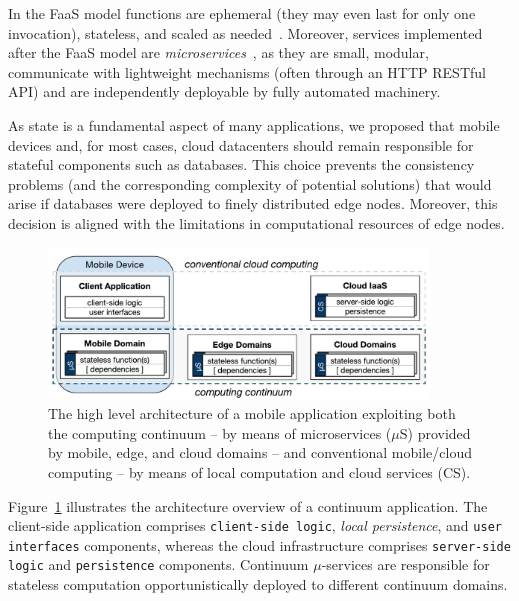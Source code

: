 In the FaaS model functions are ephemeral (they may even last for only one invocation), stateless, and scaled as needed~\cite{Roberts:2016}. Moreover, services implemented after the FaaS model are \textit{microservices}~\cite{lewis2014microservices}, as they are small, modular, communicate with lightweight mechanisms (often through an HTTP RESTful API) and are independently deployable by fully automated machinery. %

As state is a fundamental aspect of many applications, we proposed that mobile devices and, for most cases, cloud datacenters should remain responsible for stateful components such as databases. This choice prevents the consistency problems (and the corresponding complexity of potential solutions) that would arise if databases were deployed to finely distributed edge nodes. Moreover, this decision is aligned with the limitations in computational resources of edge nodes. %

\begin{figure}[tbp]
	\includegraphics[width=0.9\textwidth]{figs/Continuum-arch}
	\caption{The high level architecture of a mobile application exploiting both the computing continuum -- by means of microservices ($\mu$S) provided by mobile, edge, and cloud domains -- and conventional mobile/cloud computing -- by means of local computation and cloud services (CS).}
	\label{fig:Continuum-arch}
\end{figure}

Figure~\ref{fig:Continuum-arch} illustrates the architecture overview of a continuum application. The client-side application comprises \texttt{client-side logic}, \textit{local persistence}, and \texttt{user interfaces} components, whereas the cloud infrastructure comprises \texttt{server-side logic} and \texttt{persistence} components. Continuum $\mu$-services are responsible for stateless computation opportunistically deployed to different continuum domains.


